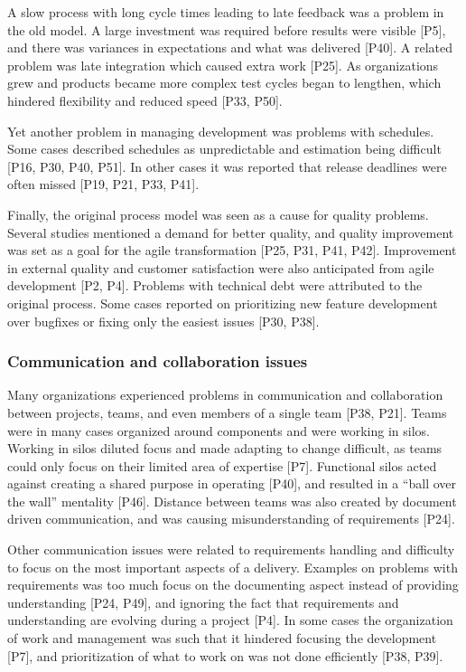\documentclass[preprint,authoryear,12pt]{elsarticle}
\begin{document}
A slow process with long cycle times leading to late feedback was a problem in
the old model. A large investment was required before results were visible [P5],
and there was variances in expectations and what was delivered [P40]. A related
problem was late integration which caused extra work [P25]. As organizations
grew and products became more complex test cycles began to lengthen, which
hindered flexibility and reduced speed [P33, P50].

Yet another problem in managing development was problems with schedules.
Some cases described schedules as unpredictable and estimation being difficult
[P16, P30, P40, P51]. In other cases it was reported that release deadlines were
often missed [P19, P21, P33, P41].

Finally, the original process model was seen as a cause for quality problems.
Several studies mentioned a demand for better quality, and quality improvement
was set as a goal for the agile transformation [P25, P31, P41, P42]. Improvement
in external quality and customer satisfaction were also anticipated from agile
development [P2, P4]. Problems with technical debt were attributed to the
original process. Some cases reported on prioritizing new feature development
over bugfixes or fixing only the easiest issues [P30, P38].


\subsubsection{Communication and collaboration issues}

Many organizations experienced problems in communication and collaboration
between projects, teams, and even members of a single team [P38, P21].
Teams were in many cases organized around components and were working in silos.
Working in silos diluted focus and made adapting to change difficult, as teams
could only focus on their limited area of expertise [P7]. Functional silos acted
against creating a shared purpose in operating [P40], and resulted in a ``ball
over the wall'' mentality [P46]. Distance between teams was also created by
document driven communication, and was causing misunderstanding of requirements
[P24].

Other communication issues were related to requirements handling and difficulty
to focus on the most important aspects of a delivery.
Examples on problems with requirements was too much focus on the documenting
aspect instead of providing understanding [P24, P49], and ignoring the fact that
requirements and understanding are evolving during a project [P4].
In some cases the organization of work and management was such that it hindered
focusing the development [P7], and prioritization of what to work on was not
done efficiently [P38, P39].
\end{document}
